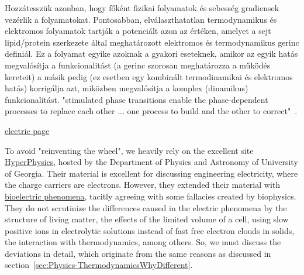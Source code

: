 Hozzátesszük azonban, hogy főként fizikai folyamatok és 
sebesség gradiensek vezérlik a folyamatokat.
Pontosabban, elválaszthatatlan termodynamikus és elektromos
folyamatok tartják a potenciált azon az értéken, amelyet
a sejt lipid/protein szerkezete által meghatározott
elektromos és termodynamikus gerinc definiál. 
Ez a folyamat egyike azoknak a gyakori eseteknek, 
amikor az egyik hatás megvalósítja a funkcionalitást 
(a gerinc szorosan meghatározza a működés kereteit)
a másik pedig (ez esetben egy kombinált termodinamikai 
és elektromos hatás) korrigálja azt, miközben megvalósítja a
komplex (dinamikus) funkcionalitást.
"stimulated phase transitions enable the phase-dependent processes to replace each other ... one process to build and the other
to correct"~\cite{BiologicalConservationLaw:2017}.
\fi


\ifx\magyar\undefined
%
\href{http://hyperphysics.phy-astr.gsu.edu/hbase/electric/elecur.html#c2}
{electric page}

\else



To avoid "reinventing the wheel", we heavily rely on the excellent site \href{http://hyperphysics.phy-astr.gsu.edu/hbase/}{HyperPhysics},
hosted by the Department of Physics and Astronomy of University of Georgia.
Their material is excellent for discussing engineering electricity, where the charge carriers are electrons. However, they extended their material with \href{http://hyperphysics.phy-astr.gsu.edu/hbase/electric/bioelcon.html#c1}{bioelectric phenomena},
tacitly agreeing with some fallacies created by biophysics. They do not scrutinize the differences caused in the electric phenomena by the structure of 
living matter, the effects of the limited volume of a cell, using slow positive ions in electrolytic solutions instead of fast free electron clouds in solids,
the interaction with thermodynamics, among others. So, 
we must discuss the deviations in detail, which originate from the same reasons as discussed in section~\ref{sec:Physics-ThermodynamicsWhyDifferent}. 

